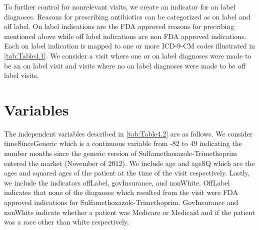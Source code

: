 \indent To further control for nonrelevant visits, we create an indicator for on label diagnoses. Reasons for prescribing antibiotics can be categorized as on label and off label. On label indications are the FDA approved reasons for precribing mentioned above while off label indications are non FDA approved indications. Each on label indication is mapped to one or more ICD-9-CM codes illustrated in \autoref{tab:Table4.1}. We consider a visit where one or on label diagnoses were made to be an on label visit and visits where no on label diagnoses were made to be off label visits. 

\section{Variables}
The independent variables described in \autoref{tab:Table4.2} are as follows. We consider timeSinceGeneric which is a continuous variable from -82 to 49 indicating the number months since the generic version of Sulfamethoxazole-Trimethoprim entered the market (November of 2012). We include age and ageSQ which are the ages and squared ages of the patient at the time of the visit respectively. Lastly, we include the indicators offLabel, govInsurance, and nonWhite. OffLabel indicates that none of the diagnoses which resulted from the visit were FDA approved indications for Sulfamethoxazole-Trimethoprim. GovInsurance and nonWhite indicate whether a patient was Medicare or Medicaid and if the patient was a race other than white respectively.\\
\begin{landscape}




\end{landscape}
